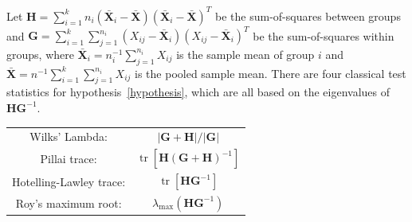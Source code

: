 \documentclass[12pt]{article} %
\DeclareMathOperator{\mytr}{tr}
\newcommand{\bX}{\mathbf{X}}
\newcommand{\bH}{\mathbf{H}}
\newcommand{\bG}{\mathbf{G}}
\theoremstyle{definition}
\begin{document}
Let $\bH=\sum_{i=1}^k n_i (\bar{\bX}_i-\bar{\bX})(\bar{\bX}_i-\bar{\bX})^T$ be the sum-of-squares between groups and $\bG=\sum_{i=1}^k \sum_{j=1}^{n_i}(X_{ij}-\bar{\bX}_i)(X_{ij}-\bar{\bX}_i)^T$ be the sum-of-squares within groups, where $\bar{\bX}_i=n_i^{-1}\sum_{j=1}^{n_i}X_{ij}$ is the sample mean of group $i$ and $\bar{\bX}=n^{-1}\sum_{i=1}^k\sum_{j=1}^{n_i}X_{ij}$ is the pooled sample mean.
   There are four classical test statistics for hypothesis~\eqref{hypothesis}, which are all based on the eigenvalues of $\bH\bG^{-1}$. 


       \begin{center}
       \begin{tabular}{|cc|}
           \hline
       {Wilks' Lambda:} & $|\bG+\bH|/|\bG|$\\
       {Pillai trace:} & $\mytr[\bH(\bG+\bH)^{-1}]$\\
       {Hotelling-Lawley trace:} & $\mytr[\bH \bG^{-1}]$\\
       {Roy's maximum root:} & $\lambda_{\max}(\bH \bG^{-1})$\\
           \hline
           \end{tabular}
       \end{center}

\end{document}
